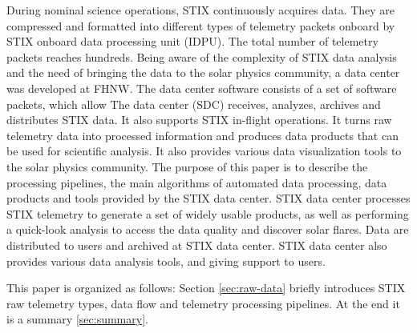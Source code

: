 \documentclass{aa}
\begin{document}
During nominal science operations, STIX continuously acquires data. They are compressed and formatted into different types of telemetry packets onboard by 
STIX onboard data processing unit (IDPU). The total number of telemetry packets reaches hundreds. 
Being aware of the complexity of STIX data analysis and  the need of bringing the data to the solar physics community, 
a data center was developed at FHNW. 
The data center software consists of a set of software packets, which allow 
The data center (SDC) receives, analyzes, archives and distributes STIX data. 
It also supports STIX in-flight operations.
It turns raw telemetry data into processed information and produces data products that can be used for scientific analysis.
It also provides various data visualization tools to the solar physics community.
The purpose of this paper is to describe the processing pipelines, 
the main algorithms of automated data processing, data products and tools provided by the STIX data center.
STIX data center processes STIX telemetry to generate a set of widely usable products, as well as performing a quick-look
analysis to access the data quality and discover solar flares. Data are distributed to users and archived at STIX data center. 
STIX data center also provides various data analysis tools, and giving support to users. 

This paper is organized as follows: Section \ref{sec:raw-data} briefly introduces STIX raw telemetry types, data flow and
telemetry processing pipelines. 
At the end it is a summary \ref{sec:summary}.
\end{document}
